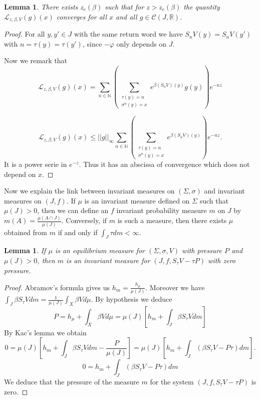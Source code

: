 \documentclass[11 pt]{article}
\newtheorem{lemma}[proposition]{Lemma}
\theoremstyle{definition}
\begin{document}
\begin{lemma}
There exists $z_c(\beta)$ such that for $z>z_c(\beta)$ the quantity $\mathcal L_{z,\beta, V}(g)(x)$ converges for all $x$ and all $g\in \mathcal C(J,\mathbb R)$.
\end{lemma}

\begin{proof}
For all $y, y'\in J$ with the same return word  we have $S_nV(y)=S_nV(y')$  with $n=\tau(y)=\tau(y')$, since $-\varphi$ only depends on $J$. 

Now we remark that $$\mathcal{L}_{z,\beta, V}(g)(x)=\displaystyle\sum_{n\in\mathbb{N}}\left(\sum_{\substack{\tau(y)=n\\ \sigma^n(y)=x}}e^{\beta(S_nV)(y)}g(y)\right)e^{-nz}$$

$$\mathcal{L}_{z,\beta, V}(g)(x)\leq ||g||_{\infty}\displaystyle\sum_{n\in\mathbb{N}}\left(\sum_{\substack{\tau(y)=n\\ \sigma^n(y)=x}}e^{\beta(S_nV)(y)}\right)e^{-nz}.$$
It is a power serie in $e^{-z}$. Thus it has an abscissa of convergence which does not depend on $x$. 
\end{proof}


Now we explain the link between invariant measures on $(\Sigma,\sigma)$ and invariant measures on $(J,f)$.
If $\mu$ is an invariant measure defined on $\Sigma$ such that $\mu(J)>0$, then we can define an $f$ invariant probability measure $m$ on $J$ by $m(A)=\frac{\mu(A\cap J)}{\mu(J)}$. Conversely, if $m$ is such a measure, then there exists $\mu$ obtained from $m$ if and only if $\int_J \tau dm<\infty$. %


\begin{lemma}\label{lem-zero}
If $\mu$ is an equilibrium measure for $(\Sigma,\sigma, V)$ with pressure $P$ and $\mu(J)>0$, then $m$ is an invariant
measure for $(J,f,S_{\tau}V-\tau P)$ with zero pressure.
\end{lemma}
\begin{proof}
Abramov's formula gives us $h_{m}=\frac{h_\mu}{\mu(J)}$. Moreover we have $\int_J \beta S_\tau Vdm=\frac{1}{\mu(J)} \int_X \beta Vd\mu$. By hypothesis  we deduce 
$$P=h_{\mu}+\int _X\beta V d\mu=\mu(J)[h_m+\int_J \beta S_\tau Vdm]$$
By Kac's lemma we obtain
$$0=\mu(J)[h_m+\int_J \beta S_\tau Vdm-\frac{P}{\mu(J)}]=\mu(J)[h_m+\int_J (\beta S_\tau V-P\tau)dm].$$
$$0=h_m+\int_J (\beta S_\tau V-P\tau)dm$$
We deduce that the pressure of the measure $m$ for the system $(J,f,S_{\tau}V-\tau P)$ is zero. 
\end{proof}
\end{document}
